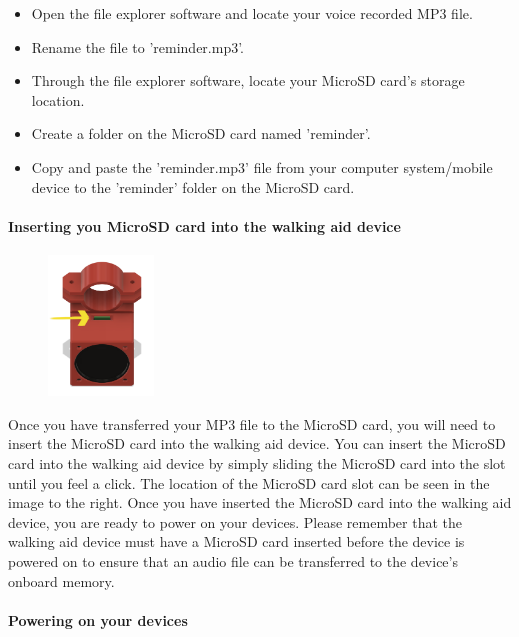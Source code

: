 				\begin{itemize}
					\item Open the file explorer software and locate your voice recorded MP3 file.
					\item Rename the file to 'reminder.mp3'.
					\item Through the file explorer software, locate your MicroSD card's storage location.
					\item Create a folder on the MicroSD card named 'reminder'.
					\item Copy and paste the 'reminder.mp3' file from your computer system/mobile device to the 'reminder' folder on the MicroSD card.
				\end{itemize}

				\paragraph{Inserting you MicroSD card into the walking aid device}\mbox{}

				\begin{figure}
					\vspace{-3.5em}
					\centering
					\includegraphics[width=0.25\textwidth]{graphics/sd_arrow.png}
				\end{figure}

				Once you have transferred your MP3 file to the MicroSD card, you will need to insert the MicroSD card into the walking aid device. You can insert the MicroSD card into the walking aid device by simply sliding the MicroSD card into the slot until you feel a click. The location of the MicroSD card slot can be seen in the image to the right. Once you have inserted the MicroSD card into the walking aid device, you are ready to power on your devices. Please remember that the walking aid device must have a MicroSD card inserted before the device is powered on to ensure that an audio file can be transferred to the device's onboard memory.

				\paragraph{Powering on your devices}\mbox{}
				\label{para:powering}


